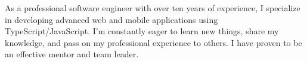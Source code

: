 


\begin{cvparagraph}

As a professional software engineer with over ten years of experience, I specialize in developing advanced web and mobile applications using TypeScript/JavaScript.
I'm constantly eager to learn new things, share my knowledge, and pass on my professional experience to others. I have proven to be an effective mentor and team leader.
\end{cvparagraph}
\vspace{-2mm}
